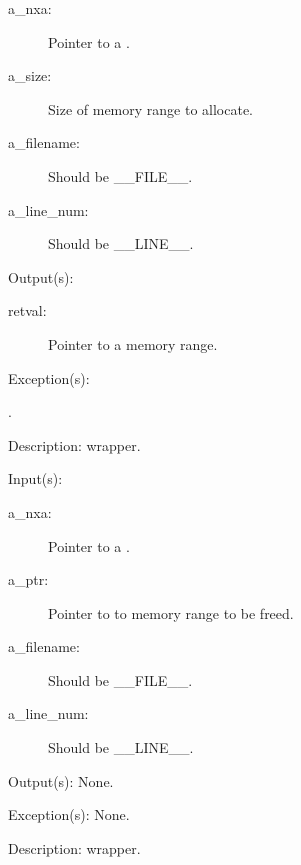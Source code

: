 \begin{capi}
\begin{capilist}
\begin{description}
		\item[a\_nxa: ]
			Pointer to a .
		\item[a\_size: ]
			Size of memory range to allocate.
		\item[a\_filename: ]
			Should be \_\_FILE\_\_.
		\item[a\_line\_num: ]
			Should be \_\_LINE\_\_.
		\end{description}
	\item[Output(s): ]
		\begin{description}\item[]
		\item[retval: ]
			Pointer to a memory range.
		\end{description}
	\item[Exception(s): ]
		\begin{description}\item[]
		\item[.]
		\end{description}
	\item[Description: ]
		 wrapper.
	\end{capilist}
\label{nxa_free_e}
\label{nxa_free}
	\begin{capilist}
	\item[Input(s): ]
		\begin{description}\item[]
		\item[a\_nxa: ]
			Pointer to a .
		\item[a\_ptr: ]
			Pointer to to memory range to be freed.
		\item[a\_filename: ]
			Should be \_\_FILE\_\_.
		\item[a\_line\_num: ]
			Should be \_\_LINE\_\_.
		\end{description}
	\item[Output(s): ] None.
	\item[Exception(s): ] None.
	\item[Description: ]
		 wrapper.
	\end{capilist}
\label{nxa_collect}
	\begin{capilist}

\end{capilist}
\end{capi}
